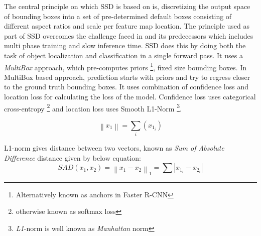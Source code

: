 \newpara The central principle on which SSD \cite{liu2016ssd} is based on is, discretizing the output space of bounding boxes into a set of pre-determined default boxes consisting of different aspect ratios and scale per feature map location. The principle used as part of SSD overcomes the challenge faced in \cite{ren2015faster} and its predecessors which includes multi phase training and slow inference time. SSD does this by doing both the task of object localization and classification in a single forward pass. It uses a \textit{MultiBox} approach, which pre-computes priors \footnote{Alternatively known as anchors in Faster R-CNN}, fixed size bounding boxes. In MultiBox based approach, prediction starts with priors and try to regress closer to the ground truth bounding boxes.
It uses combination of confidence loss and location loss for calculating the loss of the model. Confidence loss uses categorical cross-entropy \footnote{otherwise known as softmax loss} and location loss uses Smooth L1-Norm \footnote{\textit{L1}-norm is well known as \textit{Manhattan }norm}.

\begin{equation}
	\left \| x_1 \right \| =\sum_i(x_{1_i})
\end {equation}

L1-norm gives distance between two vectors, known as \textit{Sum of Absolute Difference} distance given by below equation:
\begin{equation}
	SAD(x_1,x_2) = \left \| x_1-x_2 \right \|_1 = \sum \left | x_{1_i}-x_{2_i} \right |
\end {equation}

